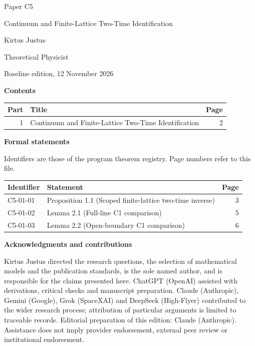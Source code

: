 \documentclass[11pt,a4paper]{article}
\begin{document}
\thispagestyle{empty}\pagestyle{empty}
{\small\sffamily \ProgramTitle\hfill Paper C5\par}
\vspace*{12mm}
{\LARGE\bfseries\raggedright{} Continuum and Finite-Lattice Two-Time Identification\par}
\vspace{9mm}
{\large Kirtus Justus\par}\vspace{1mm}Theoretical Physicist\par\AuthorLocation\par\vspace{2mm}Baseline edition, 12 November 2026\par\vspace{8mm}
\textbf{Contents}\par\vspace{1mm}
{\small\begin{longtable}{@{}r>{\raggedright\arraybackslash}p{}r@{}}
\toprule Part & Title & Page\\\midrule\endhead
1 & Continuum and Finite-Lattice Two-Time Identification & 2\\
\bottomrule\end{longtable}}
\vspace{2mm}\textbf{Formal statements}\par\vspace{1mm}
{\footnotesize Identifiers are those of the program theorem registry. Page numbers refer to this file.\par}
{\footnotesize\begin{longtable}{@{}l>{\raggedright\arraybackslash}p{}r@{}}
\toprule Identifier & Statement & Page\\\midrule\endhead
C5-01-01 & Proposition 1.1 (Scoped finite-lattice two-time inverse) & 3\\
C5-01-02 & Lemma 2.1 (Full-line C1 comparison) & 5\\
C5-01-03 & Lemma 2.2 (Open-boundary C1 comparison) & 6\\
\bottomrule\end{longtable}}
\vspace{3mm}\textbf{Acknowledgments and contributions}\par
{\small Kirtus Justus directed the research questions, the selection of mathematical models and the publication standards, is the sole named author, and is responsible for the claims presented here. ChatGPT (OpenAI) assisted with derivations, critical checks and manuscript preparation. Claude (Anthropic), Gemini (Google), Grok (SpaceXAI) and DeepSeek (High-Flyer) contributed to the wider research process; attribution of particular arguments is limited to traceable records. Editorial preparation of this edition: Claude (Anthropic). Assistance does not imply provider endorsement, external peer review or institutional endorsement.\par}
\end{document}
